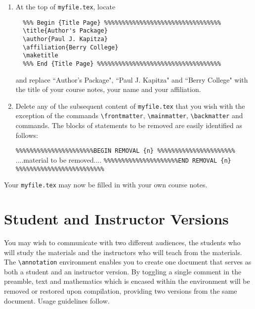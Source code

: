 \begin{enumerate}

\item At the top of \texttt{myfile.tex}, locate
\begin{verbatim}
  %%% Begin {Title Page} %%%%%%%%%%%%%%%%%%%%%%%%%%%%%%%%%
  \title{Author's Package}
  \author{Paul J. Kapitza}
  \affiliation{Berry College}
  \maketitle
  %%% End {Title Page} %%%%%%%%%%%%%%%%%%%%%%%%%%%%%%%%%%%
\end{verbatim}
and replace ``Author's Package", ``Paul J. Kapitza" and ``Berry
College" with the title of your course notes, your name and your
affiliation.

\item Delete any of the subsequent content of \texttt{myfile.tex} that you wish with
    the exception of the commands \verb|\frontmatter|,
   \verb|\mainmatter|, \verb|\backmatter| and
   \verb|| commands. The blocks of statements
   to be removed are easily identified as follows:
\begin{center}
\verb|%%%%%%%%%%%%%%%%%%%%%%BEGIN REMOVAL {n} %%%%%%%%%%%%%%%%%%%%%%|
....material to be removed....
\verb|%%%%%%%%%%%%%%%%%%%%%END REMOVAL {n} %%%%%%%%%%%%%%%%%%%%%%%%%|
\end{center}

\end{enumerate}

Your \texttt{myfile.tex} may now be filled in with your own course notes.

\section{Student and Instructor Versions}\label{ch:annotation}

You may wish to communicate with two different audiences, the students who
will study the materials and the instructors who will teach from the materials.
The \verb|\annotation| environment enables you to create one document that serves
as both a student and an instructor version.  By toggling a single comment in the preamble,
text and mathematics which is encased within the environment will be removed or restored
upon compilation, providing two versions from the same document.  Usage guidelines follow.


